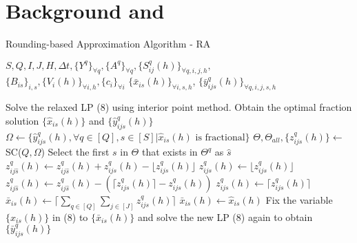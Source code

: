 \section{Background and }


\begin{algorithm}[!t]

\caption{Rounding-based Approximation Algorithm - RA}

\renewcommand{\algorithmicrequire}{\textbf{Input:}}
\renewcommand{\algorithmicensure}{\textbf{Output:}}

\begin{algorithmic}[1]
\REQUIRE $S, Q, I, J, H, \Delta t,\{Y^q\}_{\forall q}, \{A^q\}_{\forall q},\{S^q_{ij}(h)\}_{\forall q,i,j,h},$\\
$\{B_{is}\}_{i,s}, \{V_i(h)\}_{\forall i,h}, \{c_i\}_{\forall i}$
\ENSURE $\{\bar{x}_{is}(h)\}_{\forall i,s,h}$, $\{\bar{y}_{ijs}^q(h)\}_{\forall q,i,j,s,h}$

\STATE Solve the relaxed LP (8) using interior point method.
\STATE Obtain the optimal fraction solution $\{\hat{x}_{is}(h)\}$ and $\{\hat{y}_{ijs}^q(h)\}$
	\STATE $\Omega \leftarrow \{\hat{y}^q_{ijs}(h), \forall q\in [Q], s \in [S]| \hat{x}_{is}(h) \text{ is fractional}\}$
	\STATE $\Theta, \Theta_{all}, \{z^q_{ijs}(h)\} \leftarrow $SC($Q, \Omega$)
		\STATE Select the first $s$ in $\Theta$ that exists in $\Theta^q$ as $\hat{s}$
		        \STATE $z^q_{ij\hat{s}}(h) \leftarrow z^q_{ij\hat{s}}(h) + z^q_{ij{s}}(h) -\lfloor z^q_{ij{s}}(h)\rfloor$
		        \STATE $z^q_{ij{s}}(h) \leftarrow \lfloor z^q_{ij{s}}(h)\rfloor$
		    \ELSE
		        \STATE $z^q_{ij\hat{s}}(h) \leftarrow z^q_{ij\hat{s}}(h) - (\lceil z^q_{ij{s}}(h)\rceil -z^q_{ij{s}}(h))$
		        \STATE $z^q_{ij{s}}(h) \leftarrow \lceil z^q_{ij{s}}(h)\rceil$
		    \ENDIF
		\ENDFOR
	\ENDFOR
			\STATE $\bar{x}_{is}(h) \leftarrow \lceil\sum\limits_{q\in[Q]}\sum\limits_{j\in[J]}z^q_{ij{s}}(h)\rceil$
		\ELSE
			\STATE $\bar{x}_{is}(h) \leftarrow \hat{x}_{is}(h)$
		\ENDIF
	\ENDFOR
\ENDFOR
\STATE Fix the variable $\{{x}_{is}(h)\}$ in (8) to $\{\bar{x}_{is}(h)\}$ and solve the new LP (8) again to obtain $\{\bar{y}_{ijs}^q(h)\}$

\end{algorithmic}	\label{RA} 
\end{algorithm}